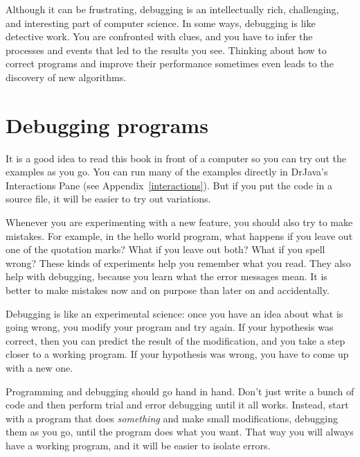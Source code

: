 Although it can be frustrating, debugging is an intellectually rich, challenging, and interesting part of computer science.
In some ways, debugging is like detective work.
You are confronted with clues, and you have to infer the processes and events that led to the results you see.
Thinking about how to correct programs and improve their performance sometimes even leads to the discovery of new algorithms.


\section{Debugging programs}
\label{sec:examples}

It is a good idea to read this book in front of a computer so you can try out the examples as you go.
You can run many of the examples directly in DrJava's Interactions Pane (see Appendix~\ref{interactions}).
But if you put the code in a source file, it will be easier to try out variations.


Whenever you are experimenting with a new feature, you should also try to make mistakes.
For example, in the hello world program, what happens if you leave out one of the quotation marks?
What if you leave out both?
What if you spell  wrong?
These kinds of experiments help you remember what you read.
They also help with debugging, because you learn what the error messages mean.
It is better to make mistakes now and on purpose than later on and accidentally.



Debugging is like an experimental science: once you have an idea about what is going wrong, you modify your program and try again.
If your hypothesis was correct, then you can predict the result of the modification, and you take a step closer to a working program.
If your hypothesis was wrong, you have to come up with a new one.

Programming and debugging should go hand in hand.
Don't just write a bunch of code and then perform trial and error debugging until it all works.
Instead, start with a program that does {\em something} and make small modifications, debugging them as you go, until the program does what you want.
That way you will always have a working program, and it will be easier to isolate errors.

